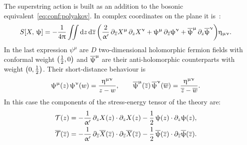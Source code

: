 The superstring action is built as an addition to the bosonic equivalent~\eqref{eq:conf:polyakov}.
In complex coordinates on the plane it is~\cite{Polchinski:1998:StringTheorySuperstring}:
\begin{equation}
  S\qty[ X,\, \uppsi ]
  =
  - \frac{1}{4 \uppi}
  \iint \dd{z} \dd{\ensuremath{\overline{z}}}
  \qty(
    \frac{2}{\upalpha'}\, \partial_{\overline{z}} X^{\upmu}\, \partial_{z} X^{\upnu}
    +
    \uppsi^{\upmu}\, \partial_{\overline{z}} \uppsi^{\upnu}
    +
    \overline{\uppsi}^{\upmu}\, \partial_{z} \overline{\uppsi}^{\upnu}
  )
  \upeta_{\upmu\upnu}.
  \label{eq:super:action}
\end{equation}
In the last expression $\psi^{\mu}$ are $D$ two-dimensional holomorphic fermion fields with conformal weight $\qty(\frac{1}{2}, 0)$ and $\overline{\uppsi}^{\upmu}$ are their anti-holomorphic counterparts with weight $\qty(0, \frac{1}{2})$. Their short-distance behaviour is
\begin{equation}
  \uppsi^{\upmu}( z )\, \uppsi^{\upnu}( w ) = \frac{\upeta^{\upmu\upnu}}{z - w},
  \qquad
  \overline{\uppsi}^{\upmu}( \overline{z} )\, \overline{\uppsi}^{\upnu}( \overline{w} ) = \frac{\upeta^{\upmu\upnu}}{\overline{z} - \overline{w}}.
\end{equation}
In this case the components of the stress-energy tensor of the theory are:
\begin{equation}
  \begin{split}
    \mathcal{T}( z )
    & =
    -\frac{1}{\upalpha'}\, \partial_{z} X( z ) \cdot \partial_{z} X( z ) - \frac{1}{2}\, \uppsi( z ) \cdot \partial_{z} \uppsi( z ),
    \\
    \overline{\mathcal{T}}( \overline{z} )
    & =
    -\frac{1}{\upalpha'}\, \partial_{\overline{z}} \overline{X}( \overline{z} ) \cdot \partial_{\overline{z}} \overline{X}( \overline{z} ) - \frac{1}{2}\, \overline{\uppsi}( \overline{z} ) \cdot \partial_{\overline{z}} \overline{\uppsi}( \overline{z} ).
  \end{split}
\end{equation}

